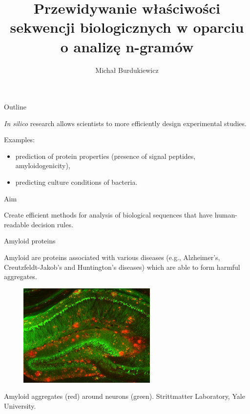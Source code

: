 \documentclass{beamer}\usepackage[]{graphicx}\usepackage[]{color}
\title{Przewidywanie właściwości sekwencji biologicznych w oparciu o analizę n-gramów}
\date{}
\author{Michał Burdukiewicz}
\institute{Zakład Genomiki i Bioinformatyki, Uniwersytet Wrocławski}
\begin{document}
  

\maketitle

\begin{frame}{Outline}

\tableofcontents

\end{frame} 

\begin{frame}{} 

\textit{In silico} research allows scientists to more efficiently design experimental studies.

Examples: 

\begin{itemize}
\item prediction of protein properties (presence of signal peptides, amyloidogenicity),  
\item predicting culture conditions of bacteria.
\end{itemize}

\end{frame}   
  
\begin{frame}{Aim} 

Create efficient methods for analysis of biological sequences that have human-readable decision rules.

\end{frame}   


\begin{frame}{Amyloid proteins}

Amyloid are proteins associated with various diseases (e.g., Alzheimer’s,
Creutzfeldt-Jakob’s and Huntington’s diseases) which are able to form harmful aggregates.

\begin{figure} 
\includegraphics[width=0.61\textwidth]{static_figure/amyloid_aggregates.jpg}
\end{figure}

\footnotesize
Amyloid aggregates (red) around neurons (green). Strittmatter Laboratory, Yale University.

\end{frame}  
\end{document}
